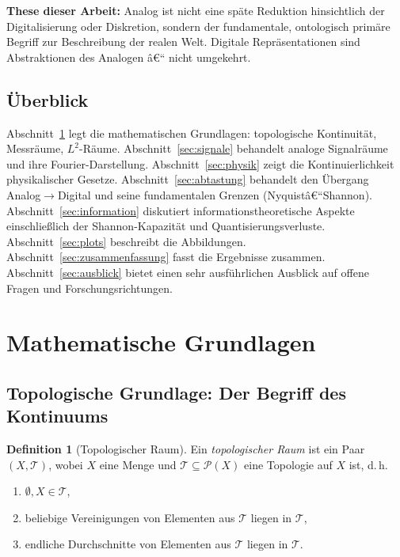 ﻿\documentclass[a4paper,12pt]{article}
\theoremstyle{definition}
\newtheorem{definition}{Definition}
\begin{document}
\textbf{These dieser Arbeit:} Analog ist nicht eine späte Reduktion hinsichtlich der
Digitalisierung oder Diskretion, sondern der fundamentale, ontologisch primäre Begriff
zur Beschreibung der realen Welt.  Digitale Repräsentationen sind Abstraktionen des
Analogen â€“ nicht umgekehrt.

\subsection{Überblick}

Abschnitt~\ref{sec:grundlagen} legt die mathematischen Grundlagen:
topologische Kontinuität, Messräume, $L^2$-Räume.
Abschnitt~\ref{sec:signale} behandelt analoge Signalräume und ihre
Fourier-Darstellung.
Abschnitt~\ref{sec:physik} zeigt die Kontinuierlichkeit physikalischer Gesetze.
Abschnitt~\ref{sec:abtastung} behandelt den Übergang Analog$\to$Digital und
seine fundamentalen Grenzen (Nyquistâ€“Shannon).
Abschnitt~\ref{sec:information} diskutiert informationstheoretische Aspekte
einschließlich der Shannon-Kapazität und Quantisierungsverluste.
Abschnitt~\ref{sec:plots} beschreibt die Abbildungen.
Abschnitt~\ref{sec:zusammenfassung} fasst die Ergebnisse zusammen.
Abschnitt~\ref{sec:ausblick} bietet einen sehr ausführlichen Ausblick auf
offene Fragen und Forschungsrichtungen.

\section{Mathematische Grundlagen}
\label{sec:grundlagen}

\subsection{Topologische Grundlage: Der Begriff des Kontinuums}

\begin{definition}[Topologischer Raum]
Ein \emph{topologischer Raum} ist ein Paar $(X, \mathcal{T})$, wobei $X$ eine Menge
und $\mathcal{T} \subseteq \mathcal{P}(X)$ eine Topologie auf $X$ ist, d.\,h.
\begin{enumerate}
    \item $\emptyset, X \in \mathcal{T}$,
    \item beliebige Vereinigungen von Elementen aus $\mathcal{T}$ liegen in $\mathcal{T}$,
    \item endliche Durchschnitte von Elementen aus $\mathcal{T}$ liegen in $\mathcal{T}$.
\end{enumerate}
\end{definition}
\end{document}
